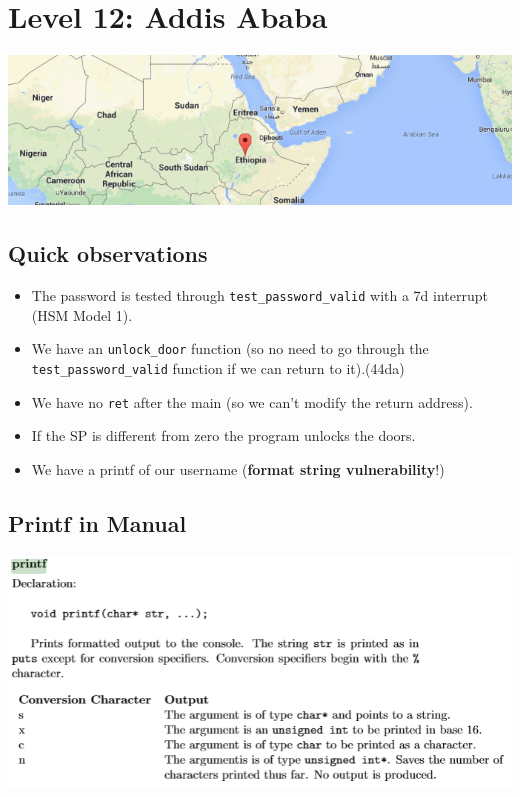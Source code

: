 \documentclass[a4paper,11pt]{article}
\begin{document}
\section{Level 12: Addis Ababa}\label{level-12-addis-ababa}

\includegraphics{img/12_1.PNG}

\subsection{Quick observations}\label{quick-observations}

\begin{itemize}
\itemsep1pt\parskip0pt
\item
  The password is tested through \texttt{test\_password\_valid} with a
  7d interrupt (HSM Model 1).
\item
  We have an \texttt{unlock\_door} function (so no need to go through
  the \texttt{test\_password\_valid} function if we can return to
  it).(44da)
\item
  We have no \texttt{ret} after the main (so we can't modify the return
  address).
\item
  If the SP is different from zero the program unlocks the doors.
\item
  We have a printf of our username (\textbf{format string
  vulnerability}!)
\end{itemize}

\subsection{Printf in Manual}\label{printf-in-manual}

\includegraphics{img/12_2.PNG}
\end{document}

